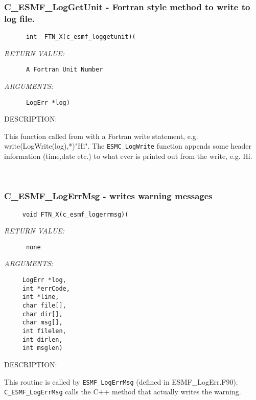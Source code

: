   \subsubsection [C\_ESMF\_LogGetUnit] {C\_ESMF\_LogGetUnit - Fortran style method to write to log file.}


  
\begin{verbatim}      int  FTN_X(c_esmf_loggetunit)(\end{verbatim}{\em RETURN VALUE:}
\begin{verbatim}      A Fortran Unit Number\end{verbatim}{\em ARGUMENTS:}
\begin{verbatim}      LogErr *log)\end{verbatim}
{\sf DESCRIPTION:\\ }


      This function called from with a Fortran write statement, e.g.
      write(LogWrite(log),*)"Hi".  The {\tt ESMC\_LogWrite} function
      appends some
      header information (time,date etc.) to what ever is printed out
      from the write, e.g. Hi. 
 
\mbox{}\hrulefill\ 
 
\subsubsection [C\_ESMF\_LogErrMsg] {C\_ESMF\_LogErrMsg - writes warning messages}


  
\begin{verbatim}     void FTN_X(c_esmf_logerrmsg)(\end{verbatim}{\em RETURN VALUE:}
\begin{verbatim}      none\end{verbatim}{\em ARGUMENTS:}
\begin{verbatim}     LogErr *log,
     int *errCode,
     int *line, 
     char file[],
     char dir[],
     char msg[], 
     int filelen,
     int dirlen,
     int msglen)\end{verbatim}
{\sf DESCRIPTION:\\ }


      This routine is called by {\tt ESMF\_LogErrMsg} (defined in ESMF\_LogErr.F90).  
      {\tt C\_ESMF\_LogErrMsg} calls the C++ method that actually writes
      the warning.
   
